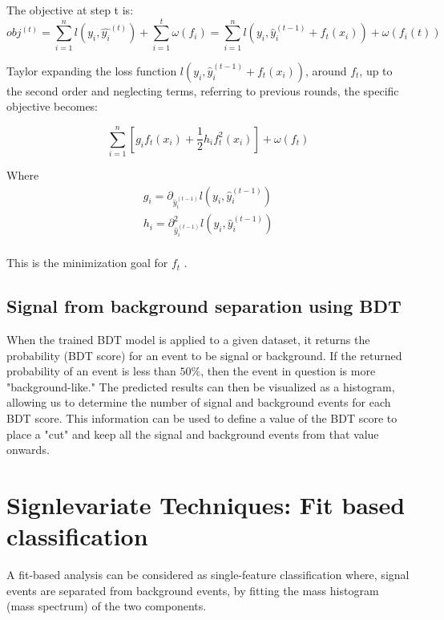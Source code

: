 \begin{enumerate}
The objective at step t is:
\begin{equation}
obj^{(t)} = \sum_{i=1}^{n} l(y_{i}, \hat{y_{i}}^{(t)}) + \sum_{i=1}^{t}\omega(f_{i}) = \sum _{i=1}^{n} l(y_{i}, \hat{y}_{i}^{(t-1)} + f_{t}(x_{i})) + \omega(f_{i}(t))
\end{equation}

Taylor expanding the loss function \(l(y_{i}, \hat{y}_{i}^{(t-1)} + f_{t}(x_{i}))\), around \(f_{t}\), up to the second order and neglecting terms, referring to previous rounds, the specific objective becomes:

\begin{equation}
\sum_{i=1}^{n}\left [ g_{i}f_{t}(x_{i})+\frac{1}{2}h_{i}f^{2}_{t} (x_{i}) \right ] + \omega(f_{t})
\end{equation}

Where
\begin{equation}
\begin{matrix}
g_{i} = \partial_{\hat{y}_{i}^{(t-1) }} l(y_{i}, \hat{y}_{i}^{(t-1)} ) \\
h_{i} = \partial^{2}_{\hat{y}_{i}^{(t-1) }} l(y_{i}, \hat{y}_{i}^{(t-1)} ) \\
\end{matrix}
\end{equation}

This is the minimization goal for \(f_{t}\) . \cite{xgboost}
\end{enumerate}




\subsection{Signal from background separation using BDT}
\label{sec:orga5ba63e}
When the trained BDT model is applied to a given dataset, it returns the probability (BDT score) for an event to be signal or background. If the returned probability of an event is less than \(50\%\), then the event in question is more "background-like." The predicted results can then be visualized as a histogram, allowing us to determine the number of signal and background events for each BDT score. This information can be used to define a value of the BDT score to place a "cut" and keep all the signal and background events from that value onwards.
\section{Signlevariate Techniques: Fit based classification}
\label{sec:org96f471c}
A fit-based analysis can be considered as single-feature classification where, signal events  are  separated from  background events, by fitting the mass histogram (mass spectrum) of the two components. 

